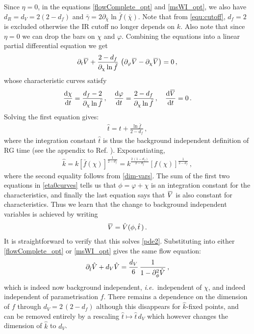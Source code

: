\documentclass[11pt]{book} %
\newcommand{\overbar}[1]{\mkern 1.5mu\overline{\mkern-1.5mu#1\mkern-1.5mu}\mkern 1.5mu}
\newcommand{\bV}{\overbar V}
\newcommand\ie{\textit{i.e.}\ }
\newcommand{\vp}{\varphi}
\newcommand{\bc}{\bar \chi}
\newcommand{\hV}{\hat V}
\newcommand{\hk}{\hat k}
\newcommand{\hatt}{\hat t}
\numberwithin{equation}{chapter}
\begin{document}
Since $\eta=0$, in the equations \eqref{flowComplete_opt} and \eqref{msWI_opt},
we also have $d_R=d_V=2(2-d_f)$ and $\bar{\gamma}=2\partial_{\bc}\ln\bar{f}(\bc)$.
Note that from \eqref{equ:cutoff}, $d_f=2$ is excluded otherwise the IR cutoff no longer depends on $k$.
Also note that since $\eta=0$ we can drop the bars on $\chi$ and $\vp$.
Combining the equations into a linear partial differential equation we get
\begin{align}
  \label{pde2}
  \partial_t\bV +\frac{2-d_f}{\partial_{\chi}\ln\bar{f}} \,
  \left(\partial_{\vp}\bV-\partial_{\chi}\bV\right) =0\,,
\end{align}
whose characteristic curves satisfy
\begin{align}
  \label{eta0curves}
  \frac{\mathrm d\chi}{\mathrm dt}=\frac{d_f-2}{\partial_{\chi}\ln\bar{f}}\,,
  \quad
  \frac{\mathrm d\vp}{\mathrm dt}=\frac{2-d_f}{\partial_{\chi}\ln\bar{f}}\,,
  \quad
  \frac{\mathrm d\bV}{\mathrm dt}=0\,.
\end{align}
Solving the first equation gives:
\begin{align}
  \label{hatt}
  \hatt = t+\frac{\ln\bar{f}}{2-d_f}\,,
\end{align}
where the integration constant $\hatt$ is thus the background independent definition of RG time
(see the appendix to Ref. \cite{Dietz:2015owa}). Exponentiating,
\begin{align}
  \hk = k \left[ \bar{f}(\chi) \right]^{\frac{1}{2-d_f}} = k^{\frac{2\,(1-d_f)}{2-d_f}}
  \left[ f(\chi) \right]^{\frac{1}{2-d_f}}\,,
\end{align}
where the second equality follows from \eqref{dim-vars}.
The sum of the first two equations in \eqref{eta0curves} tells us that $\phi=\vp+\chi$ is an
integration constant for the characteristics,
and finally the last equation says that $\bV$ is also constant for characteristics.
Thus we learn that the change to background independent variables is achieved by writing
\begin{align}
  \label{background-independent}
  \bV = \hV(\phi,\hatt\,)\,.
\end{align}
It is straightforward to verify that this solves \eqref{pde2}.
Substituting into either \eqref{flowComplete_opt} or \eqref{msWI_opt} gives the same flow equation:
\begin{align}
  \label{bi-flow}
  \partial_{\hatt}\hV +d_V\hV = \frac{d_V}{6} \, \frac{1}{1-\partial^2_\phi\hV^{\vphantom{H^H}}}\,,
\end{align}
which is indeed now background independent, \ie independent of $\chi$,
and indeed independent of parametrisation $f$.
There remains a dependence on the dimension of $f$ through $d_V = 2\,(2-d_f)$ although this disappears
for $\hk$-fixed points, and can be removed entirely by a rescaling $\hatt\mapsto \hatt\, d_V$ which however
changes the dimension of $\hat{k}$ to $d_V$.
\end{document}

